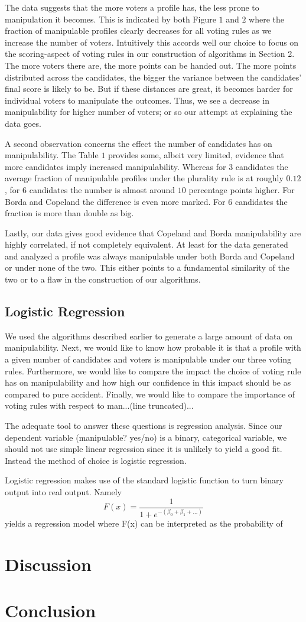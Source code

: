\documentclass[10pt,a4paper]{article}
\begin{document}
The data suggests that the more voters a profile has, the less prone to manipulation it becomes. This is indicated by both Figure $1$ and $2$ where the fraction of manipulable profiles clearly decreases for all voting rules as we increase the number of voters. Intuitively this accords well our choice to focus on the scoring-aspect of voting rules in our construction of algorithms in Section 2. The more voters there are, the more points can be handed out. The more points distributed across the candidates, the bigger the variance between the candidates' final score is likely to be. But if these distances are great, it becomes harder for individual voters to manipulate the outcomes. Thus, we see a decrease in manipulability for higher number of voters; or so our attempt at explaining the data goes.

A second observation concerns the effect the number of candidates has on manipulability. The Table $1$ provides some, albeit very limited, evidence that more candidates imply increased manipulability. Whereas for $3$ candidates the average fraction of manipulable profiles under the plurality rule is at roughly $0.12$, for $6$ candidates the number is almost around $10$ percentage points higher. For Borda and Copeland the difference is even more marked. For $6$ candidates the fraction is more than double as big.

Lastly, our data gives good evidence that Copeland and Borda manipulability are highly correlated, if not completely equivalent. At least for the data generated and analyzed a profile was always manipulable under both Borda and Copeland or under none of the two. This either points to a fundamental similarity of the two or to a flaw in the construction of our algorithms.
\subsection{Logistic Regression}
We used the algorithms described earlier to generate a large amount of data on manipulability. Next, we would like to know how probable it is that a profile with a given number of candidates and voters is manipulable under our three voting rules. Furthermore, we would like to compare the impact the choice of voting rule has on manipulability and how high our confidence in this impact should be as compared to pure accident. Finally, we would like to compare the importance of voting rules with respect to man...(line truncated)...

The adequate tool to answer these questions is regression analysis. Since our dependent variable (manipulable? yes/no) is a binary, categorical variable, we should not use simple linear regression since it is unlikely to yield a good fit. Instead the method of choice is logistic regression.

Logistic regression makes use of the standard logistic function to turn binary output into real output. Namely \[F(x)=\frac{1}{1+e^{-(\beta_0+\beta_1+...)}}\] yields a regression model where F(x) can be interpreted as the probability of
\section{Discussion}
\section{Conclusion}
\end{document}
